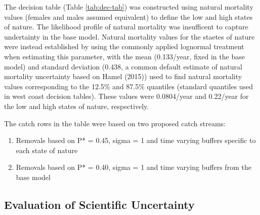 \documentclass[11pt,
  english,
  a4paper,
]{article}
\begin{document}
\leavevmode\tagmcend\tagstructend\par


The decision table (Table \ref{tab:dec-tab}) was constructed using natural mortality values (females and males assumed equivalent) to define the low and high states of nature. The likelihood profile of natural mortality was insufficent to capture undertainty in the base model. Natural mortality values for the staetes of nature were instead established by using the commonly applied lognormal treatment when estimating this parameter, with the mean (0.133/year, fixed in the base model) and standard deviation (0.438, a common default estimate of natural mortality uncertainty based on Hamel (2015)) used to find natural mortality values corresponding to the 12.5\% and 87.5\% quantiles (standard quantiles used in west coast decision tables). These values were 0.0804/year and 0.22/year for the low and high states of nature, respectively.

\leavevmode\tagmcend\tagstructend\par


The catch rows in the table were based on two proposed catch streams:

\leavevmode\tagmcend\tagstructend\par


\begin{enumerate}
\def\labelenumi{\arabic{enumi}.}
\item

  Removals based on P* = 0.45, sigma = 1 and time varying buffers specific to each state of nature

  \tagmcend\tagstructend\tagstructend
\item

  Removals based on P* = 0.40, sigma = 1 and time varying buffers from the base model

  \tagmcend\tagstructend\tagstructend
\end{enumerate}

\tagstructend


\hypertarget{evaluation-of-scientific-uncertainty}{%
\subsection{Evaluation of Scientific Uncertainty}\label{evaluation-of-scientific-uncertainty}}
\end{document}
